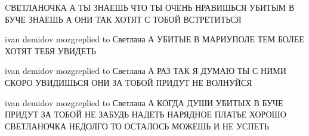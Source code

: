  
 
 
 
 

CВЕТЛАНОЧКА А ТЫ ЗНАЕШЬ ЧТО ТЫ ОЧЕНЬ НРАВИШЬСЯ УБИТЫМ В БУЧЕ ЗНАЕШЬ А ОНИ ТАК ХОТЯТ С ТОБОЙ ВСТРЕТИТЬСЯ

ivan demidov mozgreplied to Светлана
А УБИТЫЕ В МАРИУПОЛЕ ТЕМ БОЛЕЕ ХОТЯТ ТЕБЯ УВИДЕТЬ

ivan demidov mozgreplied to Светлана
А РАЗ ТАК Я ДУМАЮ ТЫ С НИМИ СКОРО УВИДИШЬСЯ
ОНИ ЗА ТОБОЙ ПРИДУТ НЕ ВОЛНУЙСЯ

ivan demidov mozgreplied to Светлана
А КОГДА ДУШИ УБИТЫХ В БУЧЕ ПРИДУТ ЗА ТОБОЙ НЕ ЗАБУДЬ НАДЕТЬ НАРЯДНОЕ ПЛАТЬЕ ХОРОШО СВЕТЛАНОЧКА НЕДОЛГО ТО ОСТАЛОСЬ МОЖЕШЬ И НЕ УСПЕТЬ
